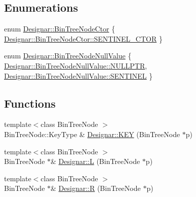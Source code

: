 \subsection*{Enumerations}
\begin{DoxyCompactItemize}
\item 
enum \hyperlink{namespace_designar_a679bc99fd69a3601faa5d6d47f865106}{Designar\+::\+Bin\+Tree\+Node\+Ctor} \{ \hyperlink{namespace_designar_a679bc99fd69a3601faa5d6d47f865106a4f4a7d253320785e63c000ed8d4e1b07}{Designar\+::\+Bin\+Tree\+Node\+Ctor\+::\+S\+E\+N\+T\+I\+N\+E\+L\+\_\+\+C\+T\+OR}
 \}
\item 
enum \hyperlink{namespace_designar_adc51778fc9415de368881abd254cca7c}{Designar\+::\+Bin\+Tree\+Node\+Null\+Value} \{ \hyperlink{namespace_designar_adc51778fc9415de368881abd254cca7cabf31abdbb1a298903e3a7f0edd0dcaf9}{Designar\+::\+Bin\+Tree\+Node\+Null\+Value\+::\+N\+U\+L\+L\+P\+TR}, 
\hyperlink{namespace_designar_adc51778fc9415de368881abd254cca7cae6e9f5d5d8fb4be11d981eba8db34c14}{Designar\+::\+Bin\+Tree\+Node\+Null\+Value\+::\+S\+E\+N\+T\+I\+N\+EL}
 \}
\end{DoxyCompactItemize}
\subsection*{Functions}
\begin{DoxyCompactItemize}
\item 
{\footnotesize template$<$class Bin\+Tree\+Node $>$ }\\Bin\+Tree\+Node\+::\+Key\+Type \& \hyperlink{namespace_designar_a5270cb81375a915ab30d0948ef371264}{Designar\+::\+K\+EY} (Bin\+Tree\+Node $\ast$p)
\item 
{\footnotesize template$<$class Bin\+Tree\+Node $>$ }\\Bin\+Tree\+Node $\ast$\& \hyperlink{namespace_designar_aa11847bfbb36f5f6368a877524609016}{Designar\+::L} (Bin\+Tree\+Node $\ast$p)
\item 
{\footnotesize template$<$class Bin\+Tree\+Node $>$ }\\Bin\+Tree\+Node $\ast$\& \hyperlink{namespace_designar_ab60731964168f0fca0491dba6ded179b}{Designar\+::R} (Bin\+Tree\+Node $\ast$p)
\end{DoxyCompactItemize}
